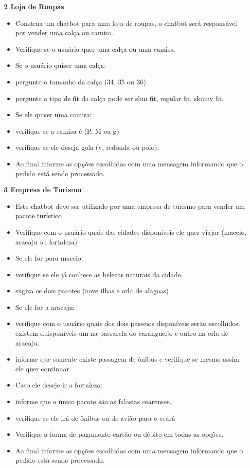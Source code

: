 \documentclass[14pt,a4paper,oneside]{book}
\begin{document}
\textbf{2 Loja de Roupas} \\

\begin{itemize}[nosep]
	\item Construa um chatbot para uma loja de roupas, o chatbot será responsável por vender uma calça ou camisa.
	\item Verifique se o usuário quer uma calça ou uma camisa.
	\item Se o usuário quiser uma calça:
	\item pergunte o tamanho da calça (34, 35 ou 36)
	\item pergunte o tipo de fit da calça pode ser slim fit, regular fit, skinny fit.
	\item Se ele quiser uma camisa:
	\item verifique se a camisa é (P, M ou g)
	\item verifique se ele deseja gola (v, redonda ou polo).
	\item Ao final informe as opções escolhidas com uma mensagem informando que o pedido está sendo processado.
\end{itemize} 

\vspace{\baselineskip}

\textbf{3 Empresa de Turismo} \\

\begin{itemize}[nosep]
	\item Este chatbot deve ser utilizado por uma empresa de turismo para vender um pacote turístico
	\item Verifique com o usuário quais das cidades disponíveis ele quer viajar (maceio, aracaju ou fortaleza)
	\item Se ele for para maceio:
	\item verifique se ele já conhece as belezas naturais da cidade.
	\item sugira os dois pacotes (nove ilhas e orla de alagoas)
	\item Se ele for a aracaju:
	\item verifique com o usuário quais dos dois passeios disponíveis serão escolhidos. existem duisponíveis um na passarela do carangueijo e outro na orla de aracaju.
	\item informe que somente existe passagem de ônibus e verifique se mesmo assim ele quer continuar
	\item Caso ele deseje ir a fortaleza:
	\item informe que o único pacote são as falasias cearenses.
	\item verifique se ele irá de ônibus ou de avião para o ceará
	\item Verifique a forma de pagamento cartão ou débito em todas as opções.
	\item Ao final informe as opções escolhidas com uma mensagem informando que o pedido está sendo processado.
\end{itemize} 
\end{document}
